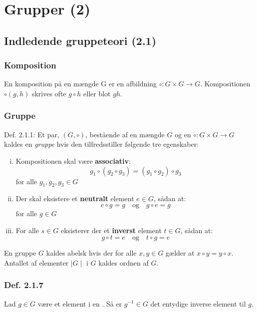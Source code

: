 \section{Grupper (2)}
\subsection{Indledende gruppeteori (2.1)}
\subsubsection{Komposition}
\label{Komposition}
En komposition på en mængde G er en afbildning $\circ: G \times G \rightarrow G$.
Kompositionen $\circ(g, h)$ skrives ofte $g \circ h$ eller blot $gh$.

\subsubsection{Gruppe}
\label{Gruppe}
Def. 2.1.1: Et par, $(G, \circ)$, bestående af en mængde $G$ og en
 $\circ: G \times G \rightarrow G$ kaldes en
\textit{gruppe} hvis den tilfredsstiller følgende tre egenskaber:
\begin{enumerate}[(i)]
  \item Kompositionen skal være \textbf{associativ}:
  \begin{equation*}
  g_1 \circ (g_2 \circ g_3) = (g_1 \circ g_2) \circ g_3
  \end{equation*}
  for alle $g_1, g_2, g_3 \in G$
  
  \item Der skal eksistere et \textbf{neutralt} element $e \in G$, sådan at:
  \begin{equation*}
  e \circ g = g \quad \text{og}\quad g \circ e = g
  \end{equation*}
  for alle $g \in G$
  
  \item For alle $s \in G$ eksisterer der et \textbf{inverst} element $t \in
  G$, sådan at: 
  \begin{equation*}
  g \circ t = e \quad \text{og} \quad t \circ g = e
  \end{equation*}
\end{enumerate}
En gruppe $G$ kaldes abelsk hvis der for alle $x, y \in G$ gælder at $x \circ y
= y \circ x$. Antallet af elementer $\mid G\mid$ i $G$ kaldes ordnen af $G$.

\subsubsection{Def. 2.1.7}
Lad $g \in G$ være et element i en . Så er $g^{-1} \in G$ det
entydige inverse element til $g$.

